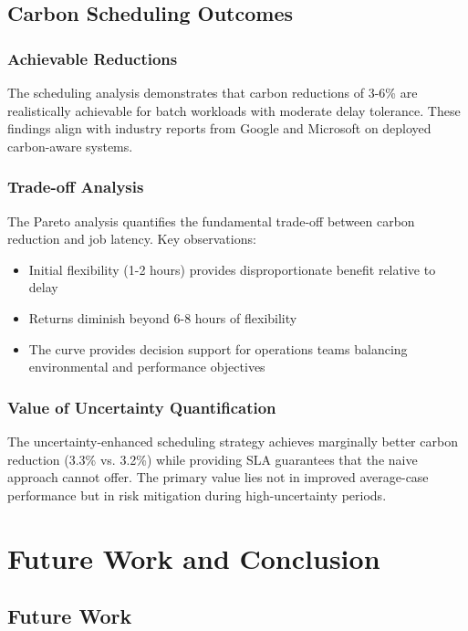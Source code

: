 \documentclass[12pt]{report}
\begin{document}
\section{Carbon Scheduling Outcomes}

\subsection{Achievable Reductions}

The scheduling analysis demonstrates that carbon reductions of 3-6\% are realistically achievable for batch workloads with moderate delay tolerance. These findings align with industry reports from Google and Microsoft on deployed carbon-aware systems.

\subsection{Trade-off Analysis}

The Pareto analysis quantifies the fundamental trade-off between carbon reduction and job latency. Key observations:

\begin{itemize}
    \item Initial flexibility (1-2 hours) provides disproportionate benefit relative to delay
    \item Returns diminish beyond 6-8 hours of flexibility
    \item The curve provides decision support for operations teams balancing environmental and performance objectives
\end{itemize}

\subsection{Value of Uncertainty Quantification}

The uncertainty-enhanced scheduling strategy achieves marginally better carbon reduction (3.3\% vs. 3.2\%) while providing SLA guarantees that the naive approach cannot offer. The primary value lies not in improved average-case performance but in risk mitigation during high-uncertainty periods.

\chapter{Future Work and Conclusion}

\section{Future Work}
\end{document}
